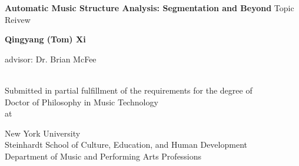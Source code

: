 \begin{titlepage}
	\begin{center}
		\vspace*{4cm}

		\textbf{\large Automatic Music Structure Analysis: Segmentation and Beyond}
		\vspace{0.5cm}
        Topic Reivew

		\vspace{0.8cm}
		\textbf{Qingyang (Tom) Xi}
		
		\vspace{1cm}
		advisor: Dr. Brian McFee
		\vfill
		
		\submissiondate \\
		\vspace{1cm}
		{\small Submitted in partial fulfillment of the requirements for the degree of\\ Doctor of Philosophy in Music Technology \\ at}
            
		\vspace{0.5cm}
		New York University \\
		Steinhardt School of Culture, Education, and Human Development \\
		Department of Music and Performing Arts Professions
   \end{center}
\end{titlepage}
\raggedright
\setlength{\parindent}{0.5in}
